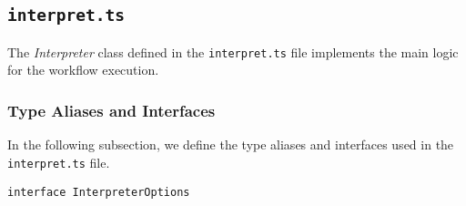 \subsection{\texttt{interpret.ts}}

The \textit{Interpreter} class defined in the \texttt{interpret.ts} file implements the main logic for the workflow execution.

\subsubsection{Type Aliases and Interfaces}

In the following subsection, we define the type aliases and interfaces used in the \texttt{interpret.ts} file.

\emptyline
\verb|interface InterpreterOptions|

\smallskip

